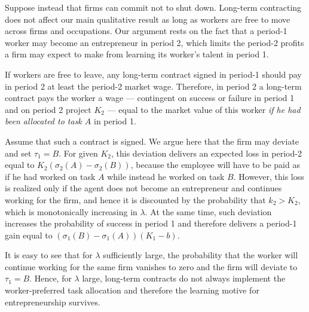 \documentclass[12pt,american]{paper}
\theoremstyle{remark}
\begin{document}
Suppose instead that firms can commit not to shut down. Long-term contracting does not affect our main qualitative result  as long as workers are free to move across firms and occupations.  Our argument rests on the fact that a period-1 worker may become an entrepreneur in period 2, which limits the period-2 profits a firm may expect to make from learning its worker's talent in period 1. 

If workers are free to leave, any long-term contract signed in period-1 should pay in period 2 at least the period-2 market wage. Therefore, in period 2 a long-term contract pays the worker  a wage --- contingent on success or failure in period 1 and on  period 2 project $K_2$ --- equal to the market value of this worker \emph{if he had been allocated to task $A$} in period 1. 


Assume that such a contract is signed. We argue here that the firm may deviate and set $\tau_1=B$. For given $K_2$, this deviation delivers an expected loss in period-2 equal to $K_2 (\sigma_2(A)-\sigma_2(B))$, because the employee will have to be paid as if he had worked on task $A$ while instead he worked on task $B$. However, this loss is realized only if the agent does not become an entrepreneur and continues working for the firm, and hence it is discounted by the probability that $k_2>K_2$, which is monotonically increasing in $\lambda$. At the same time, such deviation increases the probability of success in period 1 and therefore delivers a period-1 gain equal to $(\sigma_1(B)-\sigma_1(A))(K_1-b)$. 

It is easy to see that for $\lambda$ sufficiently large, the probability that the worker will continue working for the same firm vanishes to zero and the firm will deviate to  $\tau_1=B$. Hence, for $\lambda$ large, long-term contracts do not always implement the worker-preferred task allocation and therefore the learning motive for entrepreneurship survives.


 

\end{document}
